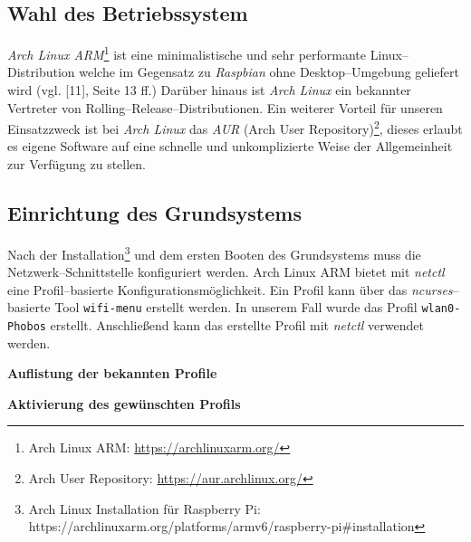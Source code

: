 \documentclass[11pt,ngerman,toc=listof,index=totoc]{scrreprt}
\newenvironment{Shaded}{}{}
\newcommand{\KeywordTok}[1]{\textcolor[rgb]{0.00,0.44,0.13}{\textbf{{#1}}}}
\newcommand{\CommentTok}[1]{\textcolor[rgb]{0.38,0.63,0.69}{\textit{{#1}}}}
\newcommand{\NormalTok}[1]{{#1}}
\begin{document}
\subsection{Wahl des Betriebssystem}\label{wahl-des-betriebssystem}

\emph{Arch Linux ARM}\footnote{Arch Linux ARM:
  \url{https://archlinuxarm.org/}} ist eine minimalistische und sehr
performante Linux--Distribution welche im Gegensatz zu \emph{Raspbian}
ohne Desktop--Umgebung geliefert wird (vgl. {[}11{]}, Seite 13 ff.)
Darüber hinaus ist \emph{Arch Linux} ein bekannter Vertreter von
Rolling--Release--Distributionen. Ein weiterer Vorteil für unseren
Einsatzzweck ist bei \emph{Arch Linux} das \emph{AUR} (Arch User
Repository)\footnote{Arch User Repository:
  \url{https://aur.archlinux.org/}}, dieses erlaubt es eigene Software
auf eine schnelle und unkomplizierte Weise der Allgemeinheit zur
Verfügung zu stellen.

\subsection{Einrichtung des
Grundsystems}\label{einrichtung-des-grundsystems}

Nach der Installation\footnote{Arch Linux Installation für Raspberry Pi:
  https://archlinuxarm.org/platforms/armv6/raspberry-pi\#installation}
und dem ersten Booten des Grundsystems muss die Netzwerk--Schnittstelle
konfiguriert werden. Arch Linux ARM bietet mit \emph{netctl} eine
Profil--basierte Konfigurationsmöglichkeit. Ein Profil kann über das
\emph{ncurses}--basierte Tool \texttt{wifi-menu} erstellt werden. In
unserem Fall wurde das Profil \texttt{wlan0-Phobos} erstellt.
Anschließend kann das erstellte Profil mit \emph{netctl} verwendet
werden.

\textbf{Auflistung der bekannten Profile}

\begin{Shaded}
\end{Shaded}

\textbf{Aktivierung des gewünschten Profils}

\begin{Shaded}
\end{Shaded}
\end{document}

